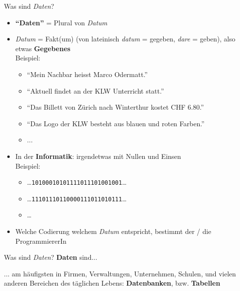 \begin{frame}[fragile]{Was sind \textit{Daten}?}
    \begin{itemize}[<+->]
      \item \textbf{``Daten''} = Plural von \textit{Datum}
      \item \textit{Datum} = Fakt(um) (von lateinisch \textit{datum} = gegeben, \textit{dare} = geben), also etwas \textbf{Gegebenes}\\
            Beispiel:
            \begin{itemize}
              \item ``Mein Nachbar heisst Marco Odermatt.''
              \item ``Aktuell findet an der KLW Unterricht statt.''
              \item ``Das Billett von Zürich nach Winterthur kostet CHF 6.80.''
              \item ``Das Logo der KLW besteht aus blauen und roten Farben.''
              \item ...
            \end{itemize}
      \item In der \textbf{Informatik}: irgendetwas mit Nullen und Einsen\\
            Beispiel:
            \begin{itemize}
              \item \ldots\verb|10100010101111011101001001|\ldots
              \item \ldots\verb|11101110110000111011010111|\ldots
              \item \ldots
            \end{itemize}
      \item Welche Codierung welchem \textit{Datum} entspricht, bestimmt der / die ProgrammiererIn
    \end{itemize}
\end{frame}
\begin{frame}[fragile]{Was sind \textit{Daten}?}
  \textbf{Daten} sind...\\\hspace{0.5cm}

  ... am häufigsten in Firmen, Verwaltungen, Unternehmen, Schulen, und vielen anderen Bereichen des täglichen Lebens: \textbf{Datenbanken}, bzw. \textbf{Tabellen}
\end{frame}


